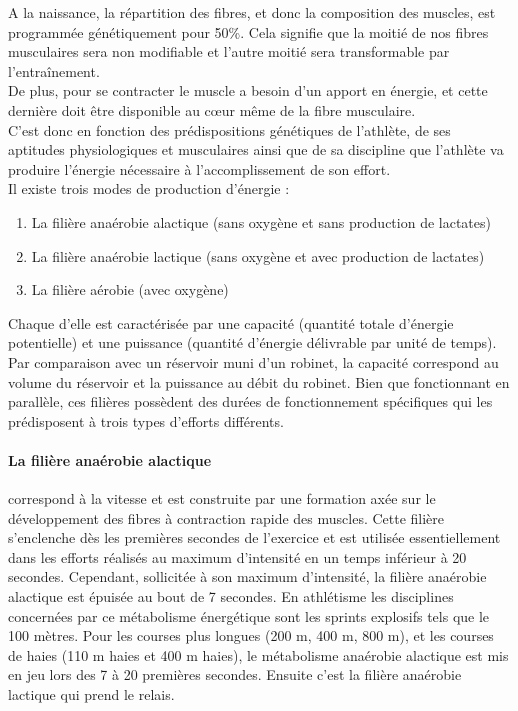         A la naissance, la répartition des fibres, et donc la composition des muscles, est programmée génétiquement pour 50\%. Cela signifie que la moitié de nos fibres musculaires sera non modifiable et l’autre moitié sera transformable par l’entraînement.\\
        
        De plus, pour se contracter le muscle a besoin d'un apport en énergie, et cette dernière doit être disponible au cœur même de la fibre musculaire.\\
        
        C'est donc en fonction des prédispositions génétiques de l'athlète, de ses aptitudes physiologiques et musculaires ainsi que de sa discipline que l'athlète va produire l'énergie nécessaire à l'accomplissement de son effort.\\
      
        Il existe trois modes de production d'énergie : 
        \begin{enumerate}
            \item La filière anaérobie alactique (sans oxygène et sans production de lactates) 
            \item La filière anaérobie lactique (sans oxygène et avec production de lactates)
            \item La filière aérobie (avec oxygène)\\
        \end{enumerate}
        
        Chaque d’elle est caractérisée par une capacité (quantité totale d'énergie potentielle) et une puissance (quantité d'énergie délivrable par unité de temps). Par comparaison avec un réservoir muni d'un robinet, la capacité correspond au volume du réservoir et la puissance au débit du robinet. 
        Bien que fonctionnant en parallèle, ces filières possèdent des durées de fonctionnement spécifiques qui les prédisposent à trois types d'efforts différents.
        
        \paragraph{La filière anaérobie alactique}
        correspond à la vitesse et est construite par une formation axée sur le développement des fibres à contraction rapide des muscles. 
        Cette filière s’enclenche dès les premières secondes de l’exercice et est utilisée essentiellement dans les efforts réalisés au maximum d’intensité en un temps inférieur à 20 secondes. Cependant, sollicitée à son maximum d’intensité, la filière anaérobie alactique est épuisée au bout de 7 secondes. En athlétisme les disciplines concernées par ce métabolisme énergétique sont les sprints explosifs tels que le 100 mètres.  Pour les courses plus longues (200 m, 400 m, 800 m), et les courses de haies (110 m haies et 400 m haies), le métabolisme anaérobie alactique est mis en jeu lors des 7 à 20 premières secondes. Ensuite c'est la filière anaérobie lactique qui prend le relais.
        
